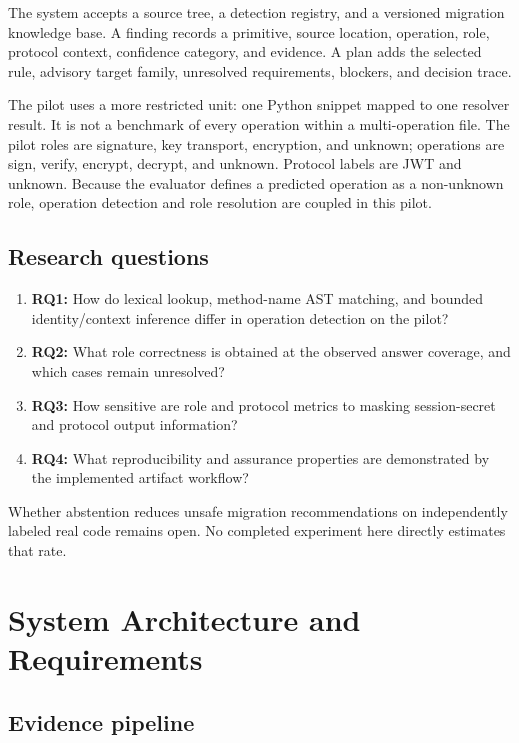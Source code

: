 \documentclass[conference,a4paper]{IEEEtran}
\begin{document}
The system accepts a source tree, a detection registry, and a versioned migration knowledge base. A finding records a primitive, source location, operation, role, protocol context, confidence category, and evidence. A plan adds the selected rule, advisory target family, unresolved requirements, blockers, and decision trace.

The pilot uses a more restricted unit: one Python snippet mapped to one resolver result. It is not a benchmark of every operation within a multi-operation file. The pilot roles are signature, key transport, encryption, and unknown; operations are sign, verify, encrypt, decrypt, and unknown. Protocol labels are JWT and unknown. Because the evaluator defines a predicted operation as a non-unknown role, operation detection and role resolution are coupled in this pilot.

\subsection{Research questions}

\begin{enumerate}
\item \textbf{RQ1:} How do lexical lookup, method-name AST matching, and bounded identity/context inference differ in operation detection on the pilot?
\item \textbf{RQ2:} What role correctness is obtained at the observed answer coverage, and which cases remain unresolved?
\item \textbf{RQ3:} How sensitive are role and protocol metrics to masking session-secret and protocol output information?
\item \textbf{RQ4:} What reproducibility and assurance properties are demonstrated by the implemented artifact workflow?
\end{enumerate}

Whether abstention reduces unsafe migration recommendations on independently labeled real code remains open. No completed experiment here directly estimates that rate.

\section{System Architecture and Requirements}

\subsection{Evidence pipeline}
\end{document}
